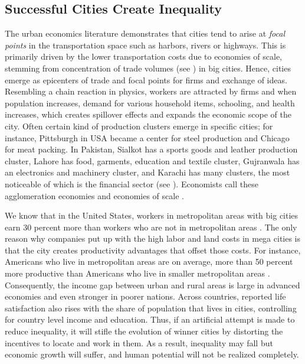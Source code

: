\documentclass[12pt]{article}
\newcommand{\1}{\mathbbm 1}
\begin{document}
		
		
		
		
	
		
		

		
		\subsection{Successful Cities Create Inequality}
		
		
		The urban economics literature demonstrates that cities tend to arise at \textit{focal points} in the transportation space such as harbors, rivers or highways. This is primarily driven by the lower transportation costs due to economies of scale, stemming from concentration of trade volumes (see \cite{brueckner2011lectures}) in big cities. Hence, cities emerge as epicenters of trade and focal points for firms and exchange of ideas. Resembling a chain reaction in physics, workers are attracted by firms and when population increases, demand for various household items, schooling, and health increases, which creates spillover effects and expands the economic scope of the city. Often certain kind of production clusters emerge in specific cities; for instance, Pittsburgh in USA became a center for steel production and Chicago for meat packing. In Pakistan, Sialkot has a sports goods and leather production cluster, Lahore has food, garments, education and textile cluster, Gujranwala has an electronics and machinery cluster, and Karachi has many clusters, the most noticeable of which is the financial sector (see \cite{azhar2019effects}). Economists call these agglomeration economies and economies of scale \cite{glaeser2013triumph}.
		
		
		We know that in the United States, workers in metropolitan areas with big cities earn 30 percent more than workers who are not in metropolitan areas \cite{glaeser2008cities}. The only reason why companies put up with the high labor and land costs in mega cities is that the city creates productivity advantages that offset those costs. For instance, Americans who live in metropolitan areas are on average, more than 50 percent more productive than Americans who live in smaller metropolitan areas \cite{glaeser2013triumph}. Consequently, the income gap between urban and rural areas is large in advanced economies and even stronger in poorer nations. Across countries, reported life satisfaction also rises with the share of population that lives in cities, controlling for country level income and education.
		Thus, if an artificial attempt is made to reduce inequality, it will stifle the evolution of winner cities by distorting the incentives to locate and work in them. As a result, inequality may fall but economic growth will suffer, and human potential will not be realized completely.
		
\end{document}
